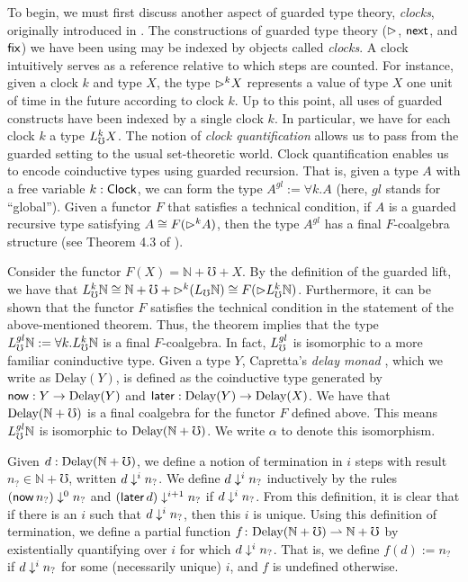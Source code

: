 To begin, we must first discuss another aspect of guarded type theory,
\emph{clocks}, originally introduced in \cite{atkey-mcbride2013}. The
constructions of guarded type theory (${\vartriangleright}$, $\mathsf{next}$, and $\mathsf{fix}$) we have been
using may be indexed by objects called \emph{clocks}. A clock intuitively serves
as a reference relative to which steps are counted. For instance, given a clock
$k$ and type $X$, the type ${\vartriangleright}^k X$ represents a value of type $X$ one unit
of time in the future according to clock $k$.
%
Up to this point, all uses of guarded constructs have been indexed by a single
clock $k$. In particular, we have for each clock $k$ a type $L_\mho^k X$. The
notion of \emph{clock quantification} allows us to pass from the guarded setting
to the usual set-theoretic world. Clock quantification enables us to encode
coinductive types using guarded recursion. That is, given a type $A$ with a free
variable $k : \mathsf{Clock}$, we can form the type $A^{gl} := \forall k. A$ (here, $gl$ stands for ``global''). Given a
functor $F$ that satisfies a technical condition, if $A$ is a guarded recursive
type satisfying $A \cong F({\vartriangleright}^k A)$, then the type $A^{gl}$ has a final
$F$-coalgebra structure (see Theorem 4.3 of
\cite{kristensen-mogelberg-vezzosi2022}). 

Consider the functor $F(X) = \mathbb{N} + {\mho} + X$. By the definition of the
guarded lift, we have that
% 
$L_\mho^k \mathbb{N} 
  \cong \mathbb{N} + {\mho} + {\vartriangleright}^k (L_\mho \mathbb{N}) 
  \cong F({\vartriangleright} L_\mho^k \mathbb{N})$.
%
Furthermore, it can be shown that the functor $F$ satisfies the technical
condition in the statement of the above-mentioned theorem. Thus, the theorem
implies that the type $L_\mho^{gl} \mathbb{N} := \forall k. L_\mho^k \mathbb{N}$ is a
final $F$-coalgebra. In fact, $L_\mho^{gl}$ is isomorphic to a more familiar coninductive type.
%
Given a type $Y$, Capretta's \emph{delay monad} \cite{lmcs:2265},
which we write as $\text{Delay}(Y)$, is defined as the coinductive type
generated by $\mathsf{now} : Y \to \text{Delay}(Y)$ and $\mathsf{later} : \text{Delay}(Y) \to \text{Delay}(X)$.
We have that $\text{Delay} (\mathbb{N} + {\mho})$ is a final coalgebra for the functor
$F$ defined above. This means $L_\mho^{gl} \mathbb{N}$ is isomorphic to
$\text{Delay}(\mathbb{N} + {\mho})$. We write $\alpha$ to denote this isomorphism.

Given $d : \text{Delay}(\mathbb{N} + {\mho})$, we define a notion of termination in
$i$ steps with result $n_? \in \mathbb{N} + {\mho}$, written $d \downarrow^i n_?$.
We define $d \downarrow^i n_?$ inductively by the rules
$(\mathsf{now}\, n_?) \downarrow^0 n_?$ and $(\mathsf{later}\, d) \downarrow^{i+1} n_?$ if $d \downarrow^i n_?$.
From this definition, it is clear that if there is an $i$
such that $d \downarrow^i n_?$, then this $i$ is unique. 
Using this definition of termination, we define a partial function 
%
$f \colon \text{Delay} (\mathbb{N} + {\mho}) \rightharpoonup \mathbb{N} + {\mho}$
%
by existentially quantifying over $i$ for which $d \downarrow^i n_?$. That is, we
define $f(d) := n_?$ if $d \downarrow^i n_?$ for some (necessarily unique) $i$, and $f$
is undefined otherwise.


